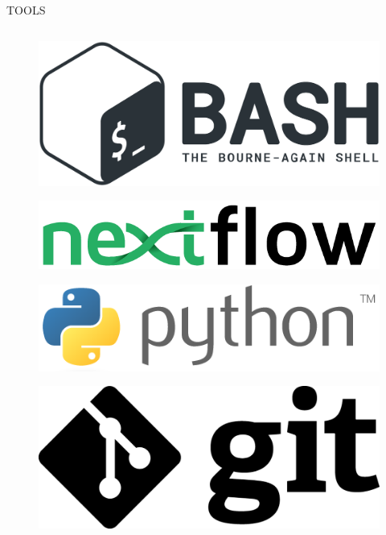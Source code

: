 \documentclass{beamer}
\begin{document}
\begin{frame}[t]{TOOLS} \vspace{20pt}
\begin{columns}[onlytextwidth]
\begin{flushleft}
\begin{figure}
\includegraphics[scale=0.25]{bash_logo.png}
\end{figure}
\begin{figure}
\includegraphics[scale=0.2]{nextflow_logo.png}
\end{figure}
\begin{figure}
\includegraphics[scale=0.2]{python_logo.png}
\end{figure}
\begin{figure}
\includegraphics[scale=0.1]{git_logo.png}

\end{figure}
\end{flushleft}
\end{columns}
\end{frame}
\end{document}
